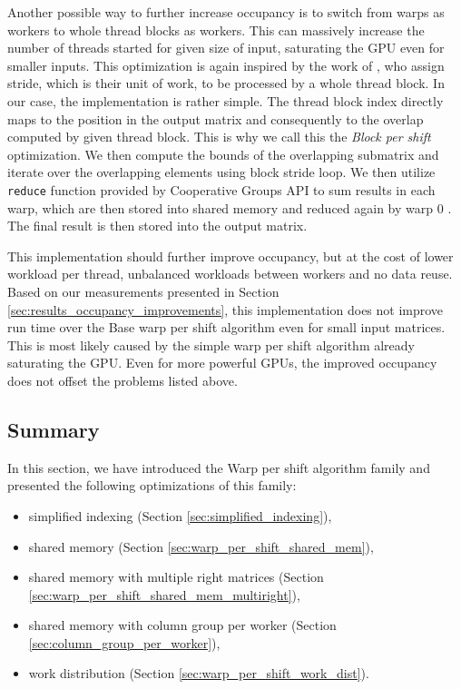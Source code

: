 Another possible way to further increase occupancy is to switch from warps as workers to whole thread blocks as workers. This can massively increase the number of threads started for given size of input, saturating the GPU even for smaller inputs. This optimization is again inspired by the work of \citet{paper:levenstein}, who assign stride, which is their unit of work, to be processed by a whole thread block. In our case, the implementation is rather simple. The thread block index directly maps to the position in the output matrix and consequently to the overlap computed by given thread block. This is why we call this the \textit{Block per shift} optimization. We then compute the bounds of the overlapping submatrix and iterate over the overlapping elements using block stride loop. We then utilize \texttt{reduce} function provided by Cooperative Groups API to sum results in each warp, which are then stored into shared memory and reduced again by warp 0 \citep{site:cuda_reduction}. The final result is then stored into the output matrix. 

This implementation should further improve occupancy, but at the cost of lower workload per thread, unbalanced workloads between workers and no data reuse. Based on our measurements presented in Section \ref{sec:results_occupancy_improvements}, this implementation does not improve run time over the Base warp per shift algorithm even for small input matrices. This is most likely caused by the simple warp per shift algorithm already saturating the GPU. Even for more powerful GPUs, the improved occupancy does not offset the problems listed above.

\subsection{Summary}

In this section, we have introduced the Warp per shift algorithm family and presented the following optimizations of this family:
\begin{itemize}
	\item simplified indexing (Section \ref{sec:simplified_indexing}),
	\item shared memory (Section \ref{sec:warp_per_shift_shared_mem}),
	\item shared memory with multiple right matrices (Section \ref{sec:warp_per_shift_shared_mem_multiright}),
	\item shared memory with column group per worker (Section \ref{sec:column_group_per_worker}),
	\item work distribution (Section \ref{sec:warp_per_shift_work_dist}).
\end{itemize}

